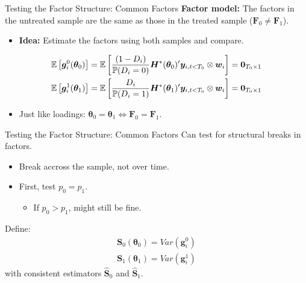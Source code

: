 \documentclass{beamer}
\newcommand{\1}{\mathds{1}} %
\begin{document}

\begin{frame}{Testing the Factor Structure: Common Factors}
    \textbf{Factor model:} The factors in the untreated sample are the same as those in the treated sample ($\bm F_0 \neq \bm F_1$).
    \begin{itemize}
        \item \textbf{Idea:} Estimate the factors using both samples and compare.
    \end{itemize}

    \begin{gather*}
    \mathbb{E}\left[\bm g^0_i(\bm \theta_0)\right] = \mathbb{E}\left[\frac{(1-D_i)}{\mathbb{P}(D_i = 0)} \bm H^*(\bm \theta_0)' \bm y_{i,t < T_0} \otimes \bm w_i \right] = \bm 0_{T_0 \times 1} \\
    \mathbb{E}\left[\bm g^1_i(\bm \theta_1)\right] = \mathbb{E}\left[\frac{D_i}{\mathbb{P}(D_i = 1)} \bm H^*(\bm \theta_1)' \bm y_{i,t < T_0} \otimes \bm w_i \right] = \bm 0_{T_0 \times 1}
\end{gather*}
\begin{itemize}
    \item Just like loadings: $\bm \theta_0 = \bm \theta_1 \iff \bm F_0 = \bm F_1$.
\end{itemize}{}
\end{frame}


\begin{frame}{Testing the Factor Structure: Common Factors}
    Can test for structural breaks in factors.
    \begin{itemize}
        \item Break accross the sample, not over time. 
        \item First, test $p_0 = p_1$.
        \begin{itemize}
            \item If $p_0 > p_1$, might still be fine. 
        \end{itemize}
    \end{itemize}

    \vspace{1cm}

    Define:
    \begin{gather*}
    \bm S_0(\bm \theta_0) = Var(\bm g^0_i)\\
    \bm S_1(\bm \theta_1) = Var(\bm g^1_i)
\end{gather*}
with consistent estimators $\widehat{\bm S}_0$ and $\widehat{\bm S}_1$.
\end{frame}
\end{document}
